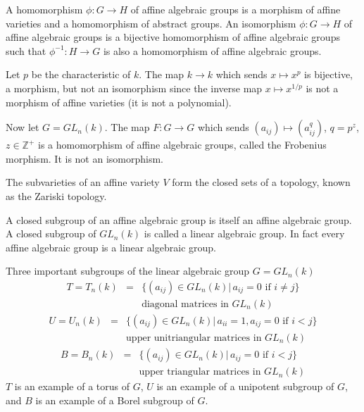 A homomorphism $\phi: G\rightarrow H$ of affine algebraic groups is a morphism of affine varieties and a homomorphism of abstract groups. An isomorphism $\phi: G\rightarrow H$ of affine algebraic groups is a bijective homomorphism of affine algebraic groups such that $\phi^{-1}:H\rightarrow G$ is also a homomorphism of affine algebraic groups.

\begin{example}
	Let $p$ be the characteristic of $k$. The map $k\rightarrow k$ which sends $x\mapsto x^p$ is bijective, a morphism, but not an isomorphism since the inverse map $x\mapsto x^{1/p}$ is not a morphism of affine varieties (it is not a polynomial).
	
	Now let $G = GL_n(k)$. The map $F:G\rightarrow G$ which sends $(a_{ij})\mapsto (a_{ij}^q)$, $q = p^z$, $z \in \mathbb{Z}^+$ is a homomorphism of affine algebraic groups, called the Frobenius morphism. It is not an isomorphism.
\end{example}

The subvarieties of an affine variety $V$ form the closed sets of a topology, known as the Zariski topology.

A closed subgroup of an affine algebraic group is itself an affine algebraic group. A closed subgroup of $GL_n(k)$ is called a linear algebraic group. In fact every affine algebraic group is a linear algebraic group.

\begin{example}
	Three important subgroups of the linear algebraic group $G = GL_n(k)$
	\begin{eqnarray*}
		T = T_n(k) &=& \{ (a_{ij}) \in GL_n(k) |\, a_{ij} = 0 \textrm{ if } i \neq j\}\\
		&& \textrm{diagonal matrices in } GL_n(k)
	\end{eqnarray*}
	\begin{eqnarray*}
		U = U_n(k) &=& \{ (a_{ij}) \in GL_n(k) |\, a_{ii} = 1, a_{ij} = 0 \textrm{ if } i < j\}\\
		&& \textrm{upper unitriangular matrices in } GL_n(k)
	\end{eqnarray*}
	\begin{eqnarray*}
		B = B_n(k) &=& \{ (a_{ij}) \in GL_n(k) |\, a_{ij} = 0 \textrm{ if } i < j\}\\
		&& \textrm{upper triangular matrices in } GL_n(k)
	\end{eqnarray*}
	$T$ is an example of a torus of $G$, $U$ is an example of a unipotent subgroup of $G$, and $B$ is an example of a Borel subgroup of $G$.
\end{example}

